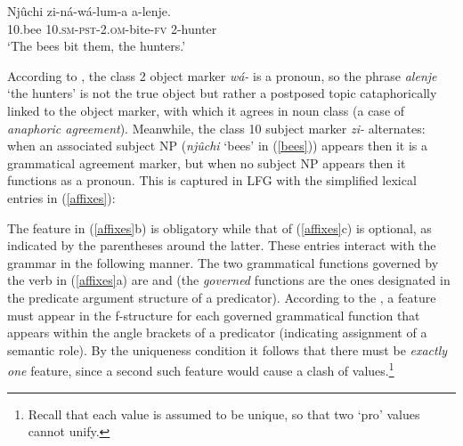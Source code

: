  \begin{exe} 
\ex	\label{bees}
{\gll Nj\^{u}chi   zi-n\'a-w\'{a}-lum-a  a-lenje. \\
 10.bee 10.\textsc{sm}-\textsc{pst}-2.\textsc{om}-bite-\textsc{fv} 2-hunter \\
\glt `The bees bit them, the hunters.' }
\end{exe}

\noindent
According to \citet{bresnan+mchombo:1987},  the class 2 object marker \textit{w\'{a}-} is a pronoun, so the phrase \textit{alenje} `the hunters' is not the true object but rather a postposed topic cataphorically linked to the object marker, with which it agrees in noun class (a case of \textit{anaphoric agreement}).  Meanwhile, the class 10 subject marker \textit{zi-} alternates: when an associated subject NP (\textit{njûchi} ‘bees’ in (\ref{bees})) appears then it is a grammatical agreement marker, but when no subject NP appears then it functions as a pronoun.  This is captured in LFG with the simplified lexical entries in (\ref{affixes}):

\eal 
 \label{affixes}
 \zl 
 
\noindent
The  feature in (\ref{affixes}b) is obligatory while that of (\ref{affixes}c) is optional, as indicated by the parentheses around the latter.  These entries interact with the grammar in the following manner.  The two grammatical functions governed by the verb in (\ref{affixes}a) are  and  (the \textit{governed} functions are the ones designated in the predicate argument structure of a predicator).  According to the , a  feature must appear in the f-structure for each governed grammatical function that appears within the angle brackets of a predicator (indicating assignment of a semantic role).  By the uniqueness condition it follows that there must be \textit{exactly one}  feature, since a second such feature would cause a clash of values.\footnote{Recall that each  value is assumed to be unique, so that two `{pro}' values cannot unify.}  


